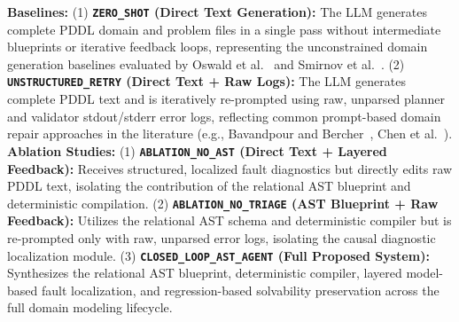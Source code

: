 \documentclass[11pt,a4paper]{article}
\begin{document}
\noindent \textbf{Baselines:} (1) \textbf{\texttt{ZERO\_SHOT} (Direct Text Generation):} The LLM generates complete PDDL domain and problem files in a single pass without intermediate blueprints or iterative feedback loops, representing the unconstrained domain generation baselines evaluated by Oswald et al.~\cite{oswald} and Smirnov et al.~\cite{smirnov2024generatingconsistentpddldomains}. (2) \textbf{\texttt{UNSTRUCTURED\_RETRY} (Direct Text + Raw Logs):} The LLM generates complete PDDL text and is iteratively re-prompted using raw, unparsed planner and validator stdout/stderr error logs, reflecting common prompt-based domain repair approaches in the literature (e.g., Bavandpour and Bercher~\cite{bavandpour}, Chen et al.~\cite{chen2026more}).\\
\textbf{Ablation Studies:} (1) \textbf{\texttt{ABLATION\_NO\_AST} (Direct Text + Layered Feedback):} Receives structured, localized fault diagnostics but directly edits raw PDDL text, isolating the contribution of the relational AST blueprint and deterministic compilation. (2) \textbf{\texttt{ABLATION\_NO\_TRIAGE} (AST Blueprint + Raw Feedback):} Utilizes the relational AST schema and deterministic compiler but is re-prompted only with raw, unparsed error logs, isolating the causal diagnostic localization module. (3) \textbf{\texttt{CLOSED\_LOOP\_AST\_AGENT} (Full Proposed System):} Synthesizes the relational AST blueprint, deterministic compiler, layered model-based fault localization, and regression-based solvability preservation across the full domain modeling lifecycle.
\end{document}
